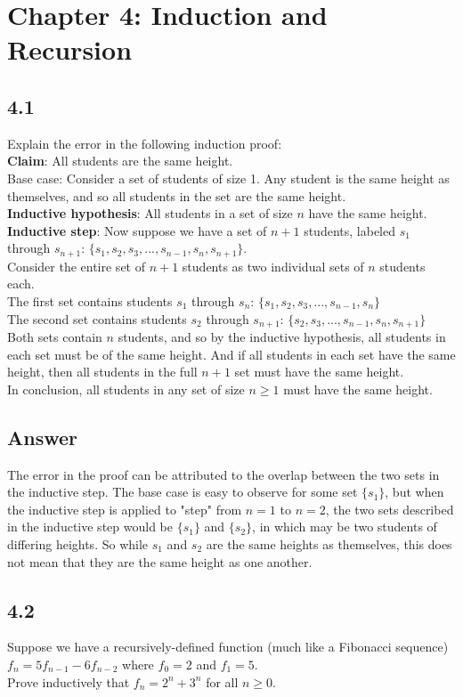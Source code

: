 \documentclass{article}
\begin{document}
\section*{Chapter 4: Induction and Recursion}
\subsection*{4.1}
Explain the error in the following induction proof:
\\ \textbf{Claim}: All students are the same height.
\\ Base case: Consider a set of students of size 1. Any student is the same height as themselves, and so all students in the set are the same height.
\\ \textbf{Inductive hypothesis}: All students in a set of size $n$ have the same height. 
\\ \textbf{Inductive step}: Now suppose we have a set of $n+1$ students, labeled $s_1$ through $s_{n+1}$: $\{s_1,s_2,s_3,...,s_{n-1},s_n,s_{n+1}\}$.
\\ Consider the entire set of $n+1$ students as two individual sets of $n$ students each.
\\ The first set contains students $s_1$ through $s_n$: $\{s_1,s_2,s_3,...,s_{n-1},s_n\}$
\\ The second set contains students $s_2$ through $s_{n+1}$: $\{s_2,s_3,...,s_{n-1},s_n,s_{n+1}\}$
\\ Both sets contain $n$ students, and so by the inductive hypothesis, all students in each set must be of the same height. And if all students in each set have the same height, then all students in the full $n+1$ set must have the same height.
\\ In conclusion, all students in any set of size $n\geq1$ must have the same height.
\newpage
\subsection*{Answer}
The error in the proof can be attributed to the overlap between the two sets in the inductive step. The base case is easy to observe for some set $\{s_1\}$, but when the inductive step is applied to "step" from $n=1$ to $n=2$, the two sets described in the inductive step would be $\{s_1\}$ and $\{s_2\}$, in which may be two students of differing heights. So while $s_1$ and $s_2$ are the same heights as themselves, this does not mean that they are the same height as one another.
\newpage
\subsection*{4.2}
Suppose we have a recursively-defined function (much like a Fibonacci sequence) $f_n=5f_{n-1}-6f_{n-2}$ where $f_0=2$ and $f_1=5$.
\\ Prove inductively that $f_n=2^n+3^n$ for all $n\geq0$.
\end{document}
